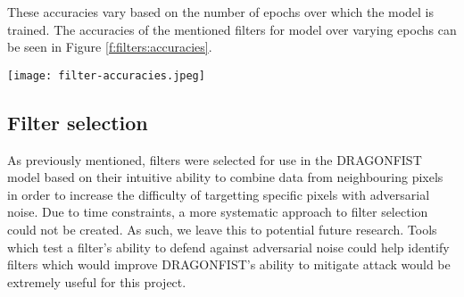 		These accuracies vary based on the number of epochs over which the model is trained. The accuracies of the mentioned filters for model over varying epochs can be seen in Figure \ref{f:filters:accuracies}.
		\begin{figure*}
			\texttt{[image: filter-accuracies.jpeg]}
			\caption{Classification accuracy during training for various image filters.}
			\label{f:filters:accuracies}
		\end{figure*}

	\subsection{Filter selection} \label{s:filters:selection}
		As previously mentioned, filters were selected for use in the DRAGONFIST model based on their intuitive ability to combine data from neighbouring pixels in order to increase the difficulty of targetting specific pixels with adversarial noise. Due to time constraints, a more systematic approach to filter selection could not be created. As such, we leave this to potential future research. Tools which test a filter's ability to defend against adversarial noise could help identify filters which would improve DRAGONFIST's ability to mitigate attack would be extremely useful for this project.
